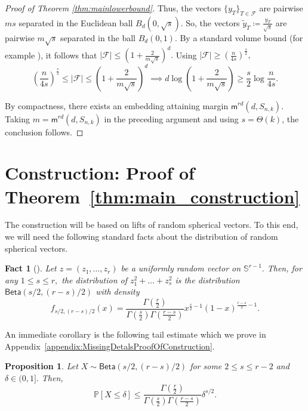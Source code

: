 \documentclass[preprint]{article}
\newtheorem{proposition}{Proposition}[]
\newtheorem{fact}{Fact}[]
\newcommand{\maxmargin}{\mathsf{m}^{rd}}
\newcommand{\Betadist}{\mathsf{Beta}}
\newcommand{\prob}{\mathbb{P}}
\newcommand{\ksparsen}{S_{n,k}}
\begin{document}
\begin{proof}[Proof of Theorem \ref{thm:mainlowerbound}]
Thus, the vectors $\{y_T\}_{T \in \mathcal{F}}$ are pairwise $ms$ separated in the Euclidean ball $B_d(0, \sqrt{s})$. So, the vectors $\tilde{y}_T\coloneqq \frac{y_T}{\sqrt{s}}$ are pairwise $m\sqrt{s}$ separated in the ball $B_d(0,1)$. By a standard volume bound (for example  \cite[Corollary 4.2.11]{Vershynin2026}), it follows that
$|\mathcal{F}| \leq  (1 + \frac{2}{m\sqrt{s}}  )^d.$ Using $|\mathcal{F}| \geq  (\frac{n}{4s}  )^\frac{s}{2},$ 
$$ (\frac{n}{4s}  )^\frac{s}{2} \leq |\mathcal{F}| \leq  (1 + \frac{2}{m\sqrt{s}}  )^d \implies d \log  (1 + \frac{2}{m\sqrt{s}}  ) \geq \frac{s}{2}\log{\frac{n}{4s}}.$$

By compactness, there exists an embedding attaining margin $\maxmargin(d,\ksparsen)$. Taking $m=\maxmargin(d,\ksparsen)$ in the preceding argument and using $s=\Theta(k)$, the conclusion follows.
\end{proof}



\section{Construction: Proof of \texorpdfstring{Theorem~\ref{thm:main_construction}}{Main Construction Theorem}}
\label{sec:proofofconstruction}
The construction will be based on lifts of random spherical vectors. To this end, we will need the following standard facts about the distribution of random spherical vectors.

\begin{fact}[\cite{frankl1990some}]
\label{fact:betadistandpsherical}
Let $z= (z_1, \ldots, z_r)$ be a uniformly random vector on $\mathbb{S}^{r-1}.$ Then, for any $1\le s \le r,$ the distribution of $z_1^2 + \ldots + z_s^2$ is the distribution $\Betadist(s/2, (r-s)/2)$ with density 
$$
f_{s/2, (r-s)/2}(x) = \frac{\Gamma(\frac{r}{2})}{\Gamma(\frac{s}{2})\Gamma(\frac{r-s}{2})}x^{\frac{s}{2}-1}(1-x)^{\frac{r-s}{2}-1}.
$$
\end{fact}
An immediate corollary is the following tail estimate which we prove in Appendix~\ref{appendix:MissingDetalsProofOfConstruction}.
\begin{proposition}
\label{prop:betaconcentration}
Let $X\sim \Betadist(s/2, (r-s)/2)$ for some $2\le s \le r-2$ and $\delta \in(0,1].$ Then,
$$
\prob[X\le \delta]\le 
\frac{\Gamma(\frac{r}{2})}{\Gamma(\frac{s}{2})\Gamma(\frac{r-s}{2})}\delta^{s/2}.
$$
\end{proposition}
\end{document}
